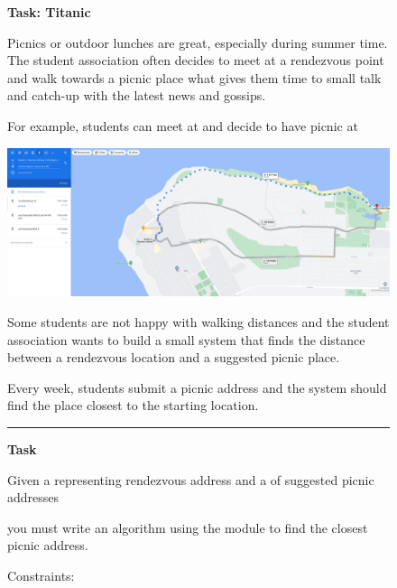 

\begin{figure}
\begin{mdframed}[backgroundcolor=gray!05] 
\begin{scriptsize}

{\large \textbf{Task: Titanic}} \bigskip


Picnics or outdoor lunches are great, especially during summer time. The student association often decides to meet at a rendezvous point and walk towards a picnic place what gives them time to small talk and catch-up with the latest news and gossips. \medskip

For example, students can meet at 
and decide to have picnic at 
  \medskip

\medskip

\includegraphics[width=\textwidth]{appendix/cp6/jericho.png}

\medskip


Some students are not happy with walking distances and the student association wants to build a small system that finds the distance between a rendezvous location and a suggested picnic place.  \medskip

Every week, students submit a picnic address and the system should find the place closest to the starting location. \medskip


\begin{center}
\rule{10cm}{0.4pt}
\end{center}

\textbf{Task} \medskip



Given a 
representing rendezvous address and a 
of suggested picnic addresses

you must write an algorithm using the 
module to find the closest picnic address. \medskip


Constraints:


\end{scriptsize}
\end{mdframed}
\end{figure}
